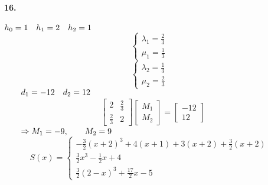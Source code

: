 \documentclass[UTF8]{ctexart}
\begin{document}
	\paragraph{16.}
		$h_0=1\quad h_1=2\quad h_2=1\\$
		\begin{equation}
			\left\{
				\begin{array}{lr}
					\lambda_1=\frac{2}{3}&\\
					\mu_1=\frac{1}{3}&
				\end{array}
			\right.
		\end{equation}
		\begin{equation}
			\left\{
				\begin{array}{lr}
					\lambda_2=\frac{1}{3}&\\
					\mu_2=\frac{2}{3}&
				\end{array}
			\right.
		\end{equation}
		$\qquad d_1=-12\quad d_2=12\\$
		\begin{displaymath}
		\begin{gathered}
		\begin{bmatrix}
			2 & \frac{2}{3} \\ \frac{2}{3} & 2
		\end{bmatrix}
		\begin{bmatrix}
			M_1 \\ M_2
		\end{bmatrix}
		=
		\begin{bmatrix}
			-12 \\ 12
		\end{bmatrix}
		\end{gathered}
		\end{displaymath}
		$\qquad \Rightarrow M_1=-9,\qquad M_2=9\\$
		\begin{equation}
			S(x)=\left\{
				\begin{array}{lr}
					-\frac{3}{2}(x+2)^3+4(x+1)+3(x+2)+\frac{3}{2}(x+2)&\\
					\frac{3}{2}x^3-\frac{1}{2}x+4&\\
					\frac{3}{2}(2-x)^3+\frac{17}{2}x-5&
				\end{array}
			\right.
		\end{equation}
	
\end{document}
